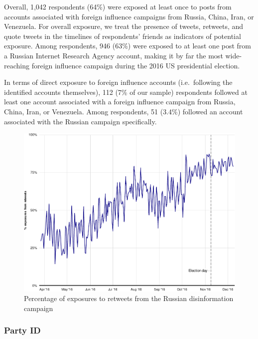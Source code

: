\documentclass[
  12pt,
]{article}
\begin{document}
Overall, 1,042 respondents (64\%) were exposed at least once to posts from accounts associated with foreign influence campaigns from Russia, China, Iran, or Venezuela. For overall exposure, we treat the presence of tweets, retweets, and quote tweets in the timelines of respondents' friends as indicators of potential exposure. Among respondents, 946 (63\%) were exposed to at least one post from a Russian Internet Research Agency account, making it by far the most wide-reaching foreign influence campaign during the 2016 US presidential election.

In terms of direct exposure to foreign influence accounts (i.e.~following the identified accounts themselves), 112 (7\% of our sample) respondents followed at least one account associated with a foreign influence campaign from Russia, China, Iran, or Venezuela. Among respondents, 51 (3.4\%) followed an account associated with the Russian campaign specifically.

\begin{figure}
\centering
\includegraphics{Supplementary_Information_files/figure-latex/Supplementary-Figure-C4-1.pdf}
\caption{\label{fig:Supplementary-Figure-C4}Percentage of exposures to retweets from the Russian disinformation campaign}
\end{figure}

\clearpage

\hypertarget{party-id}{%
\subsubsection{Party ID}\label{party-id}}
\end{document}

